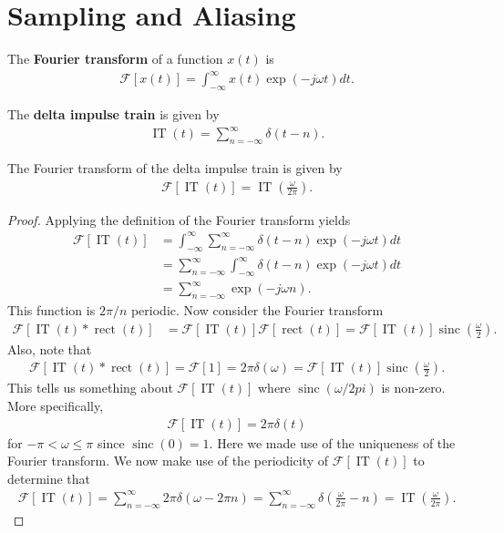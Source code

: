 \documentclass{memoir}
\newcommand{\rect}{\operatorname{rect}}
\newcommand{\sinc}{\operatorname{sinc}}
\newcommand{\IT}{\operatorname{IT}}
\newcommand{\F}{\mathcal{F}}
\begin{document}
\section{Sampling and Aliasing}
\begin{definition}
    The \textbf{Fourier transform} of a function $x(t)$ is
    \begin{align*}
        \F[x(t)] = \int_{-\infty}^{\infty} x(t) \exp(-j \omega t)dt.
    \end{align*}
\end{definition}
\begin{definition}
    The \textbf{delta impulse train} is given by
    \begin{align*}
        \IT(t)=\sum_{n=-\infty}^{\infty} \delta(t- n).
    \end{align*}
\end{definition}
\begin{theorem}
    The Fourier transform of the delta impulse train is given by
    \begin{align*}
        \F[\IT(t)]=\IT\left(\frac{\omega}{2 \pi}\right).
    \end{align*}
\end{theorem}
\begin{proof}
    Applying the definition of the Fourier transform yields
    \begin{align*}
        \F[\IT(t)] &= \int_{-\infty}^{\infty} \sum_{n=-\infty}^{\infty} \delta(t- n) \exp(-j \omega t)dt \\
        &= \sum_{n=-\infty}^{\infty}\int_{-\infty}^{\infty}\delta(t- n) \exp(-j \omega t)dt \\
        &= \sum_{n=-\infty}^{\infty} \exp(-j \omega n).
    \end{align*}
    This function is $2 \pi /n$ periodic. Now consider the Fourier transform
    \begin{align*}
        \F[\IT(t) \ast \rect(t)] &= \F[\IT(t)] \F[\rect(t)] = \F[\IT(t)] \sinc\left(\frac{\omega}{2}\right).
    \end{align*}
    Also, note that
    \begin{align*}
        \F[\IT(t) \ast \rect(t)] =\F[1] = 2 \pi \delta(\omega)= \F[\IT(t)] \sinc\left(\frac{\omega}{2}\right).
    \end{align*}
    This tells us something about $\F[\IT(t)]$ where $\sinc(\omega/2 pi)$ is non-zero. More specifically,
    \begin{align*}
        \F[\IT(t)] = 2 \pi \delta(t)
    \end{align*}
    for $-\pi < \omega \le \pi$ since $\sinc(0)=1$. Here we made use of the uniqueness of the Fourier transform. We now make use of the periodicity of $\F[\IT(t)]$ to determine that
    \begin{align*}
        \F[\IT(t)] = \sum_{n=-\infty}^{\infty} 2 \pi \delta(\omega - 2 \pi n)= \sum_{n=-\infty}^{\infty} \delta\left(\frac{\omega}{2\pi} - n\right) = \IT\left(\frac{\omega}{2\pi}\right).
    \end{align*}
\end{proof}
\end{document}
